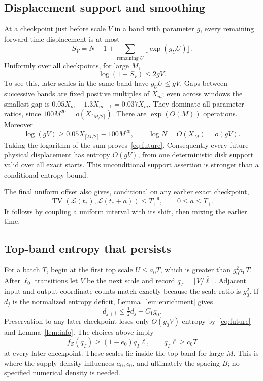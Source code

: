 \documentclass[11pt]{article}
\numberwithin{equation}{section}
\theoremstyle{definition}\newtheorem{definition}[theorem]{Definition}
\theoremstyle{remark}\newtheorem{remark}[theorem]{Remark}
\newcommand{\Lb}{\overline{\ell}}
\newcommand{\TV}{\operatorname{TV}}
\begin{document}
\subsection{Displacement support and smoothing}

At a checkpoint just before scale $V$ in a band with parameter $g$, every remaining forward time displacement is at most
\[
 S_V=N-1+\sum_{\text{remaining }U}\lfloor\exp(g_UU)\rfloor.
\]
Uniformly over all checkpoints, for large $M$,
\begin{equation}\label{eq:future}
 \log(1+S_V)\le2gV.
\end{equation}
To see this, later scales in the same band have $g_UU\le gV$. Gaps between successive bands are fixed positive multiples of $X_m$; even across windows the smallest gap is
$0.05X_m-1.3X_{m-1}=0.037X_m$. They dominate all parameter ratios, since $100M^{20}=o(X_{\lceil M/2\rceil})$. There are $\exp(O(M))$ operations. Moreover
\[
 \log(gV)\ge0.05X_{\lceil M/2\rceil}-100M^{20},
 \qquad \log N=O(X_M)=o(gV).
\]
Taking the logarithm of the sum proves~\eqref{eq:future}. Consequently every future physical displacement has entropy $O(gV)$, from one deterministic disk support valid over all exact starts. This unconditional support assertion is stronger than a conditional entropy bound.

The final uniform offset also gives, conditional on any earlier exact checkpoint,
\begin{equation}\label{eq:smoothing}
 \TV(\mathcal L(t_*),\mathcal L(t_*+a))\le T_+^{-9},
 \qquad 0\le a\le T_+.
\end{equation}
It follows by coupling a uniform interval with its shift, then mixing the earlier time.

\subsection{Top-band entropy that persists}

For a batch $T$, begin at the first top scale $U\le a_0T$, which is greater than $g_0^2a_0T$. After $\ell_0$ transitions let $V$ be the next scale and record
$q_T=\lfloor V/\Lb\rfloor$. Adjacent input and output coordinate counts match exactly because the scale ratio is $g_0^2$. If $d_j$ is the normalized entropy deficit, Lemma~\ref{lem:enrichment} gives
\[
 d_{j+1}\le\tfrac12d_j+C_1g_0.
\]
Preservation to any later checkpoint loses only $O(g_0V)$ entropy by~\eqref{eq:future} and Lemma~\ref{lem:info}. The choices above imply
\begin{equation}\label{eq:persistent}
 f_Z(q_T)\ge(1-e_0)q_T\Lb,
 \qquad q_T\Lb\ge c_0T
\end{equation}
at every later checkpoint. These scales lie inside the top band for large $M$. This is where the supply density influences $a_0,c_0$, and ultimately the spacing $B$; no specified numerical density is needed.
\end{document}
